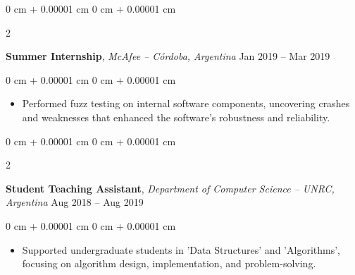 \documentclass[10pt, letterpaper]{article}
\newenvironment{highlights}{
    \begin{itemize}[
        topsep=0.10 cm,
        parsep=0.10 cm,
        partopsep=0pt,
        itemsep=0pt,
        leftmargin=0 cm + 10pt
    ]
}{
    \end{itemize}
} %
\newenvironment{onecolentry}{
    \begin{adjustwidth}{
        0 cm + 0.00001 cm
    }{
        0 cm + 0.00001 cm
    }
}{
    \end{adjustwidth}
} %
\newenvironment{twocolentry}[2][]{
    \onecolentry
    \def\secondColumn{#2}
    \setcolumnwidth{\fill, 4.5 cm}
    \begin{paracol}{2}
}{
    \switchcolumn \raggedleft \secondColumn
    \end{paracol}
    \endonecolentry
} %
\begin{document}
        \vspace{0.2 cm}



        \begin{twocolentry}{
            Jan 2019 – Mar 2019
        }
            \textbf{Summer Internship}, \textit{McAfee -- Córdoba, Argentina} \end{twocolentry}

        \vspace{0.10 cm}
        \begin{onecolentry}
            \begin{highlights}
                \item Performed fuzz testing on internal software components,
                uncovering crashes and weaknesses that enhanced the software's
                robustness and reliability.
            \end{highlights}
        \end{onecolentry}



        \vspace{0.2 cm}



        \begin{twocolentry}{
            Aug 2018 – Aug 2019
        }
            \textbf{Student Teaching Assistant}, \textit{Department of Computer Science -- UNRC, Argentina} \end{twocolentry}

        \vspace{0.10 cm}
        \begin{onecolentry}
            \begin{highlights}
                \item Supported undergraduate students in 'Data Structures' and
                'Algorithms', focusing on algorithm design, implementation, and
                problem-solving.
            \end{highlights}
        \end{onecolentry}


\end{document}
